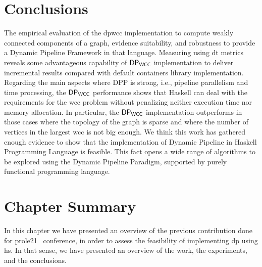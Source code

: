 \section{Conclusions}
The empirical evaluation of the \acrshort{dpwcc} implementation to compute weakly connected components of a graph, evidence suitability, 
and robustness to provide a Dynamic Pipeline Framework in that language. Measuring using \acrshort{dt} metrics reveals some advantageous capability of $\mathsf{DP_{WCC}}$ implementation to deliver incremental results compared with default containers library implementation. 
Regarding the main aspects where DPP is strong, i.e., pipeline parallelism and time processing, the $\mathsf{DP_{WCC}}$ performance shows that Haskell 
can deal with the requirements for the \acrshort{wcc} problem without penalizing neither execution time nor memory allocation. 
In particular, the $\mathsf{DP_{WCC}}$ implementation outperforms in those cases where the topology of the graph is sparse and where the number of vertices in the largest \acrshort{wcc} is not big enough. We think this work has gathered enough evidence to show that the implementation of Dynamic Pipeline in Haskell Programming Language is feasible. 
This fact opens a wide range of algorithms to be explored using the Dynamic Pipeline Paradigm, supported by purely functional programming language.

\section{Chapter Summary}
In this chapter we have presented an overview of the previous contribution done for \acrshort{prole21}~\cite{prole21} conference, in order to assess the 
feasibility of implementing \acrshort{dp} using \acrshort{hs}. In that sense, we have presented an overview of the work, the experiments, and the conclusions.

